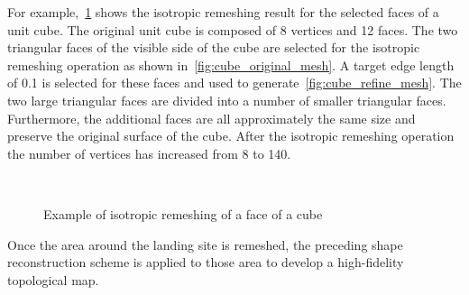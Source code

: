 \documentclass[journal]{new-aiaa}
\begin{document}
For example,~\cref{fig:cube_remesh} shows the isotropic remeshing result for the selected faces of a unit cube.
The original unit cube is composed of \num{8} vertices and \num{12} faces.
The two triangular faces of the visible side of the cube are selected for the isotropic remeshing operation as shown in~\cref{fig:cube_original_mesh}.
A target edge length of \num{0.1} is selected for these faces and used to generate~\cref{fig:cube_refine_mesh}.
The two large triangular faces are divided into a number of smaller triangular faces.
Furthermore, the additional faces are all approximately the same size and preserve the original surface of the cube.
After the isotropic remeshing operation the number of vertices has increased from \num{8} to \num{140}.
\begin{figure}[htbp]
    \centering
    ~
    \caption{Example of isotropic remeshing of a face of a cube\label{fig:cube_remesh}}
\end{figure}

Once the area around the landing site is remeshed, the preceding shape reconstruction scheme is applied to those area to develop a high-fidelity topological map. 
\end{document}
